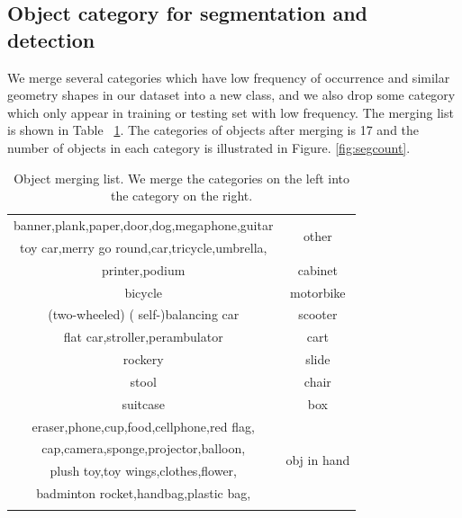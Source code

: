 \begin{appendix}
\subsection{Object category for segmentation and detection}
We merge several categories which have low frequency of occurrence and similar geometry shapes in our dataset into a new class, and we also drop some category which only appear in training or testing set with low frequency. The merging list is shown in Table ~\ref{tab:merge}. The categories of objects after merging is 17 and the number of objects in each category is illustrated in Figure. \ref{fig:segcount}.

\begin{table}[ht]
\centering
\caption{Object merging list. We merge the categories on the left into the category on the right.}
    \label{tab:merge}
    \setlength{\tabcolsep}{0.8mm}
\begin{tabular}{c|c}
\hline
banner,plank,paper,door,dog,megaphone,guitar  & \multicolumn{1}{c}{\multirow{2}{*}{other}}       \\
toy car,merry go round,car,tricycle,umbrella, & \multicolumn{1}{c}{}                             \\\hline
printer,podium                                &
cabinet                                          \\\hline
bicycle                                       & motorbike                                        \\\hline
{(}two-wheeled{)} {(} self-{)}balancing car   & scooter                                          \\\hline
flat car,stroller,perambulator &cart                                        \\\hline
rockery                                       & slide                                            \\\hline
stool                                         & chair                                            \\\hline
suitcase                                      & box                                              \\\hline
eraser,phone,cup,food,cellphone,red flag,     & \multicolumn{1}{c}{\multirow{4}{*}{obj in hand}} \\
cap,camera,sponge,projector,balloon,          & \multicolumn{1}{c}{}                             \\
plush toy,toy wings,clothes,flower,           & \multicolumn{1}{c}{}                             \\
badminton rocket,handbag,plastic bag,         &
\\\hline\multicolumn{1}{c}{}                            
\end{tabular}
\end{table}



\end{appendix}
